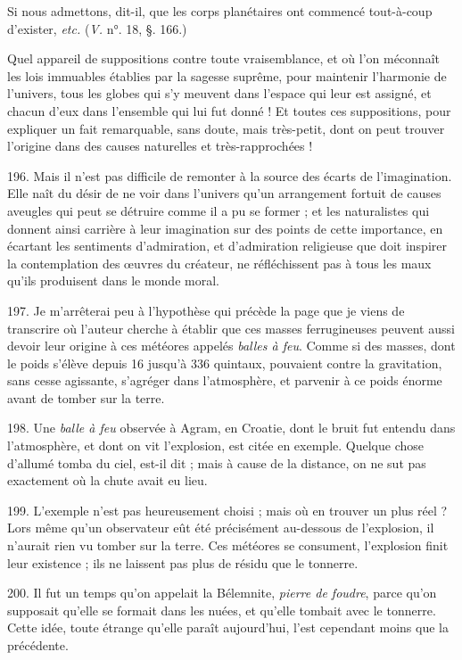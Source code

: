 \documentclass[a4paper, 11pt, oneside, polutonikogreek, french]{article}
\begin{document}
\og Si nous admettons, dit-il, que les corps planétaires ont commencé tout-à-coup d'exister, \emph{etc.} \fg (\emph{V.} n°. 18, §. 166.)

Quel appareil de suppositions contre toute vraisemblance, et où l'on méconnaît les lois immuables établies par la sagesse suprême, pour maintenir l'harmonie de l'univers, tous les globes qui s'y meuvent dans l'espace qui leur est assigné, et chacun d'eux dans l'ensemble qui lui fut donné ! Et toutes ces suppositions, pour expliquer un fait remarquable, sans doute, mais très-petit, dont on peut trouver l'origine dans des causes naturelles et très-rapprochées !

196. Mais il n'est pas difficile de remonter à la source des écarts de l'imagination. Elle naît du désir de ne voir dans l'univers qu'un arrangement fortuit de causes aveugles qui peut se détruire comme il a pu se former ; et les naturalistes qui donnent ainsi carrière à leur imagination sur des points de cette importance, en écartant les sentiments d'admiration, et d'admiration religieuse que doit inspirer la contemplation des œuvres du créateur, ne réfléchissent pas à tous les maux qu'ils produisent dans le monde moral.

197. Je m'arrêterai peu à l'hypothèse qui précède la page que je viens de transcrire où l'auteur cherche à établir que ces masses ferrugineuses peuvent aussi devoir leur origine à ces météores appelés \emph{balles à feu}. Comme si des masses, dont le poids s'élève depuis 16 jusqu'à 336 quintaux, pouvaient contre la gravitation, sans cesse agissante, s'agréger dans l'atmosphère, et parvenir à ce poids énorme avant de tomber sur la terre.

198. Une \emph{balle à feu} observée à Agram, en Croatie, dont le bruit fut entendu dans l'atmosphère, et dont on vit l'explosion, est citée en exemple. Quelque chose d'allumé tomba du ciel, est-il dit ; mais à cause de la distance, on ne sut pas exactement où la chute avait eu lieu.

199. L'exemple n'est pas heureusement choisi ; mais où en trouver un plus réel ? Lors même qu'un observateur eût été précisément au-dessous de l'explosion, il n'aurait rien vu tomber sur la terre. Ces météores se consument, l'explosion finit leur existence ; ils ne laissent pas plus de résidu que le tonnerre.

200. Il fut un temps qu'on appelait la Bélemnite, \emph{pierre de foudre}, parce qu'on supposait qu'elle se formait dans les nuées, et qu'elle tombait avec le tonnerre. Cette idée, toute étrange qu'elle paraît aujourd'hui, l'est cependant moins que la précédente.
\end{document}
